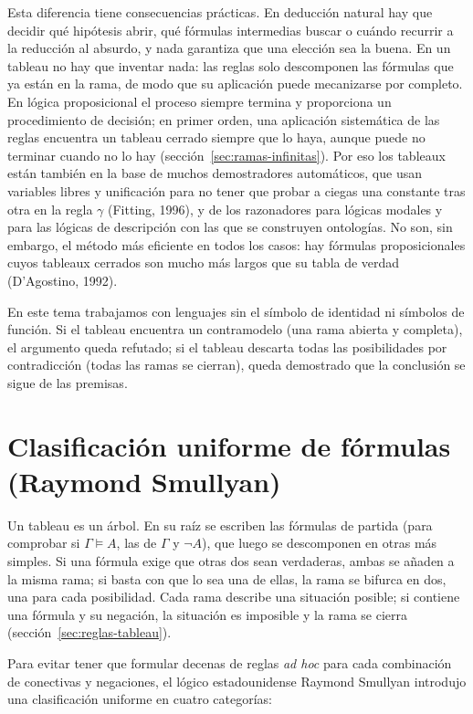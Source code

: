 Esta diferencia tiene consecuencias prácticas. En deducción natural hay que decidir qué hipótesis abrir, qué fórmulas intermedias buscar o cuándo recurrir a la reducción al absurdo, y nada garantiza que una elección sea la buena. En un tableau no hay que inventar nada: las reglas solo descomponen las fórmulas que ya están en la rama, de modo que su aplicación puede mecanizarse por completo. En lógica proposicional el proceso siempre termina y proporciona un procedimiento de decisión; en primer orden, una aplicación sistemática de las reglas encuentra un tableau cerrado siempre que lo haya, aunque puede no terminar cuando no lo hay (sección~\ref{sec:ramas-infinitas}). Por eso los tableaux están también en la base de muchos demostradores automáticos, que usan variables libres y unificación para no tener que probar a ciegas una constante tras otra en la regla $\gamma$ (Fitting, 1996), y de los razonadores para lógicas modales y para las lógicas de descripción con las que se construyen ontologías. No son, sin embargo, el método más eficiente en todos los casos: hay fórmulas proposicionales cuyos tableaux cerrados son mucho más largos que su tabla de verdad (D'Agostino, 1992).

En este tema trabajamos con lenguajes sin el símbolo de identidad ni símbolos de función. Si el tableau encuentra un contramodelo (una rama abierta y completa), el argumento queda refutado; si el tableau descarta todas las posibilidades por contradicción (todas las ramas se cierran), queda demostrado que la conclusión se sigue de las premisas.

\section{Clasificación uniforme de fórmulas (Raymond Smullyan)}

Un tableau es un árbol. En su raíz se escriben las fórmulas de
partida (para comprobar si $\Gamma \models A$, las de $\Gamma$ y
$\neg A$), que luego se descomponen en otras más simples. Si una
fórmula exige que otras dos sean verdaderas, ambas se añaden a la
misma rama; si basta con que lo sea una de ellas, la rama se bifurca en
dos, una para cada posibilidad. Cada rama describe una situación
posible; si contiene una fórmula y su negación, la situación es
imposible y la rama se cierra (sección~\ref{sec:reglas-tableau}).

Para evitar tener que formular decenas de reglas \emph{ad hoc} para cada combinación de conectivas y negaciones, el lógico estadounidense Raymond Smullyan introdujo una clasificación uniforme en cuatro categorías:

